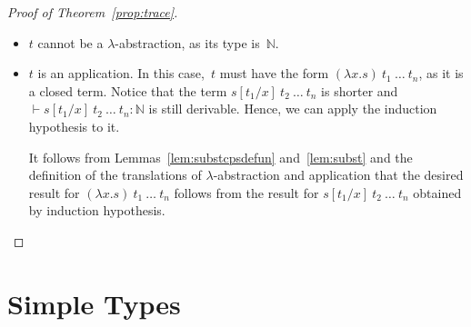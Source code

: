 \documentclass{LMCS}
\theoremstyle{definition}
\theoremstyle{plain}
\newcommand{\kw}[1]{\mathsf{#1}}
\newcommand{\NN}{\mathbb{N}}
\newcommand{\VN}{\mathtt{nat}}
\newcommand{\Capply}{\textit{apply}}
\newcommand{\SeqTm}[3]{#1 \vdash #2 \colon #3}
\newcommand{\cps}[1]{\underline{#1}}
\newcommand{\semc}[1]{\kw{Int}(#1)}
\begin{document}
\begin{proof}[Proof of Theorem~\ref{prop:trace}]
\begin{itemize}
      By the above Lemma~\ref{lem:trace}, we know that the call-trace of~$D(\cps t)$ 
      beginning with $\Capply_q(<>, <>)$ must have the form
      \[
      \Capply_q(<>, <>)\ \tau_1\ \tau_2\ \Capply_a(<>, x+y),
      \]
      where $\tau_1$ and $\tau_2$ must have the following forms:
      \begin{align*}
      \tau_1 &=\Capply_{q_1}(<>, <<>>)\dots \Capply_{a_1}(<>,x)\\
      \tau_2 &= \Capply_{q_2}(<>,<<>,x>) \dots \Capply_{a_2}(<<>,x>, y)
      \end{align*}
      Applying the induction hypothesis for~$s_1$ shows that
      the trace of~$\semc{s_1}$ starting with 
      $\Capply_{q_1}()$ simplifies 
      the trace of~$D(\cps t)$ starting with
      $\Capply_{q_1}(<>, <>)$.
      Using Lemma~\ref{lem:trace}, we get the desired property
      for~$\tau_1$.
      Similarly, the induction hypothesis for~$s_2$ shows that
      the trace of~$\semc{s_2}$ starting with 
      $\Capply_{q_2}()$ simplifies the trace of~$D(\cps t)$ starting with
      $\Capply_{q_2}(<>, <>)$.
      By Lemma~\ref{lem:trace}, the trace from 
      $\Capply_{q_2}(<>,<<>,x>)$ differs only in that it replaces
      $<>$ with $<<>,x>$ in each call and at
      least one position. But this shows
      that the trace of $\semc{\VN \cdot s_2}$
      starting with $\Capply_{q_2}(x)$ simplifies~$\tau_2$.
      Together this shows the desired property of the whole trace.
    \item
      $t$ cannot be a $\lambda$-abstraction, as its type is~$\NN$.
    \item
      $t$ is an application. In this case,~$t$ must have the 
      form $(\lambda x. s)\ t_1\ \dots\ t_n$, as it is a closed term.
      Notice that the term $s[t_1/x]\ t_2\ \dots\ t_n$ is shorter and
      $\SeqTm{}{s[t_1/x]\ t_2\ \dots\ t_n}{\NN}$ is still
      derivable.
      Hence, we can apply the induction hypothesis to it.

      It follows from Lemmas~\ref{lem:substcpsdefun}
      and~\ref{lem:subst} and the definition of the translations
      of $\lambda$-abstraction and application that 
      the desired result for $(\lambda x. s)\ t_1\ \dots\ t_n$
      follows from the result for $s[t_1/x]\ t_2\ \dots\ t_n$
      obtained by induction hypothesis.\qedhere
  \end{itemize}
\end{proof}


\section{Simple Types}
\label{sect:stl}
\end{document}
